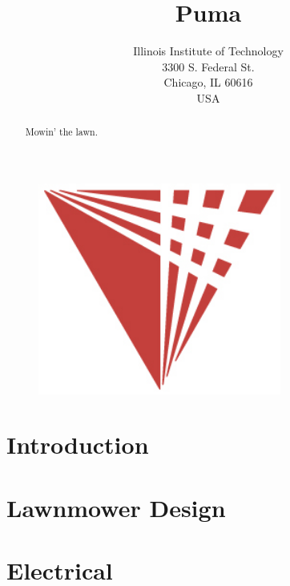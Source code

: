 \documentclass[12pt]{article}%
\title{Puma}
\author{Illinois Institute of Technology\\
3300 S. Federal St.\\
Chicago, IL 60616\\
USA}
\begin{document}
\maketitle
\begin{figure}[h]
    \begin{center}
        \includegraphics[width=8cm]{logo.jpg}
    \end{center}
\end{figure}
\pagebreak

\begin{abstract}
    Mowin' the lawn.
\end{abstract}

\pagebreak
\tableofcontents
\listoffigures
\listoftables
\pagebreak
\section{Introduction}
    
\section{Lawnmower Design}
    
\section{Electrical}
    
\end{document}
